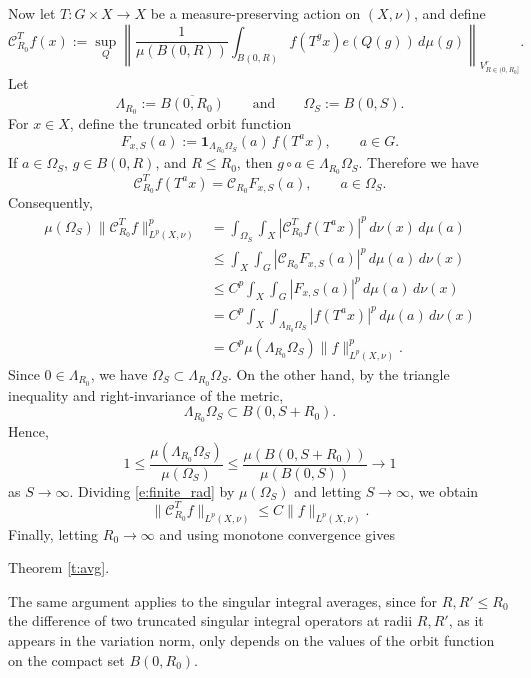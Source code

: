 \documentclass[12pt,reqno,a4paper,dvipsnames]{amsart}
\theoremstyle{plain}
\theoremstyle{definition}
\numberwithin{theorem}{section}
\numberwithin{equation}{section}
\begin{document}
Now let $T:G\times X\to X$ be a measure-preserving action on
$(X,\nu)$, and define
\[
\mathcal C^T_{R_0}f(x)
:=
\sup_Q
\left\|
\frac{1}{\mu(B(0,R))}
\int_{B(0,R)}
f(T^g x)e(Q(g))\,d\mu(g)
\right\|_{V^r_{R \in (0, R_0]}}.
\]Let
\[
        \Lambda_{R_0}:=\overline{B(0,R_0)}
        \qquad\text{and}\qquad
        \Omega_S:=B(0,S).
\]
For $x\in X$, define the truncated orbit function
\[
        F_{x,S}(a)
        :=
        \mathbf 1_{\Lambda_{R_0}\Omega_S}(a)\, f(T^a x),
        \qquad a\in G.
\]
If $a\in\Omega_S$, $g\in B(0,R)$, and $R\le R_0$, then
$g\circ a\in \Lambda_{R_0}\Omega_S$.  Therefore we have
\[
        \mathcal C^T_{R_0}f(T^a x)
        =
        \mathcal C_{R_0}F_{x,S}(a),
        \qquad a\in\Omega_S .
\]
Consequently,
\begin{align}
\mu(\Omega_S)\|\mathcal C^T_{R_0}f\|_{L^p(X,\nu)}^p
&=
\int_{\Omega_S}\int_X
|\mathcal C^T_{R_0}f(T^a x)|^p
\,d\nu(x)\,d\mu(a) \nonumber\\
&\le
\int_X\int_G
|\mathcal C_{R_0}F_{x,S}(a)|^p
\,d\mu(a)\,d\nu(x) \nonumber\\
&\le
C^p
\int_X\int_G |F_{x,S}(a)|^p
\,d\mu(a)\,d\nu(x) \nonumber\\
&=
C^p
\int_X\int_{\Lambda_{R_0}\Omega_S}
|f(T^a x)|^p
\,d\mu(a)\,d\nu(x)\nonumber \\
&=
C^p\mu(\Lambda_{R_0}\Omega_S)\|f\|_{L^p(X,\nu)}^p . \label{e:finite_rad}
\end{align}
Since $0\in\Lambda_{R_0}$, we have
$\Omega_S\subset\Lambda_{R_0}\Omega_S$.  On the other hand, by the
triangle inequality and right-invariance of the metric,
\[
        \Lambda_{R_0}\Omega_S\subset B(0,S+R_0).
\]
Hence, 
\[
1
\le
\frac{\mu(\Lambda_{R_0}\Omega_S)}{\mu(\Omega_S)}
\le
\frac{\mu(B(0,S+R_0))}{\mu(B(0,S))}
\longrightarrow 1
\]
as $S\to\infty$. Dividing \eqref{e:finite_rad} by $\mu(\Omega_S)$
and letting $S\to\infty$, we obtain
\[
        \|\mathcal C^T_{R_0}f\|_{L^p(X,\nu)}
        \le C\|f\|_{L^p(X,\nu)}.
\]
Finally, letting $R_0\to\infty$ and using monotone convergence gives

Theorem \ref{t:avg}. 

The same argument applies to the singular integral averages, since for
$R, R'\le R_0$ the difference of two truncated singular integral operators at radii $R, R'$, as it appears in the variation norm, only depends on the values of the
orbit function on the compact set $B(0,R_0)$. 
\end{document}
